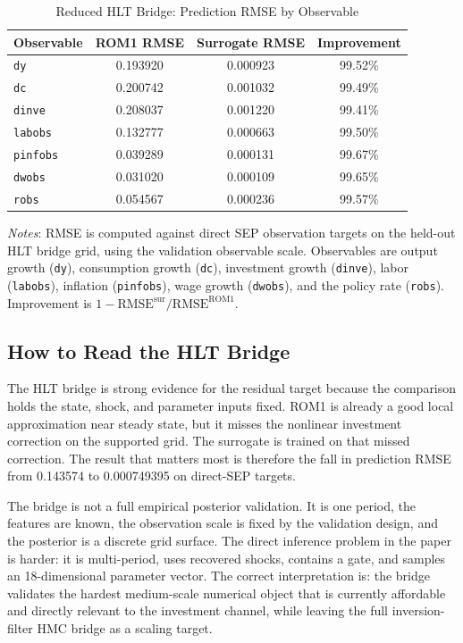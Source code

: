 \documentclass[12pt]{article}
\newcommand{\rom}{\mathrm{ROM1}}
\newcommand{\sur}{\mathrm{sur}}
\newcommand{\techappendixnotes}[1]{%
  \par\smallskip
  \noindent\begin{minipage}{0.92\textwidth}%
  \footnotesize #1%
  \end{minipage}\par%
}
\begin{document}
\begin{table}[htbp]
\centering
\caption{Reduced HLT Bridge: Prediction RMSE by Observable}
\label{tab:tech_hlt_bridge_rmse_obs}
\begin{tabular}{lccc}
\toprule
Observable & ROM1 RMSE & Surrogate RMSE & Improvement \\
\midrule
\texttt{dy} & 0.193920 & 0.000923 & 99.52\% \\
\texttt{dc} & 0.200742 & 0.001032 & 99.49\% \\
\texttt{dinve} & 0.208037 & 0.001220 & 99.41\% \\
\texttt{labobs} & 0.132777 & 0.000663 & 99.50\% \\
\texttt{pinfobs} & 0.039289 & 0.000131 & 99.67\% \\
\texttt{dwobs} & 0.031020 & 0.000109 & 99.65\% \\
\texttt{robs} & 0.054567 & 0.000236 & 99.57\% \\
\bottomrule
\end{tabular}
\techappendixnotes{\textit{Notes}: RMSE is computed against direct SEP
observation targets on the held-out HLT bridge grid, using the validation
observable scale. Observables are output growth (\texttt{dy}), consumption
growth (\texttt{dc}), investment growth (\texttt{dinve}), labor
(\texttt{labobs}), inflation (\texttt{pinfobs}), wage growth (\texttt{dwobs}),
and the policy rate (\texttt{robs}). Improvement is
\(1-\mathrm{RMSE}^{\sur}/\mathrm{RMSE}^{\rom}\).}
\end{table}

\subsection{How to Read the HLT Bridge}
\label{apptech:read_hlt_bridge}

The HLT bridge is strong evidence for the residual target because the
comparison holds the state, shock, and parameter inputs fixed. ROM1 is already
a good local approximation near steady state, but it misses the nonlinear
investment correction on the supported grid. The surrogate is trained on that
missed correction. The result that matters most is therefore the fall in
prediction RMSE from 0.143574 to 0.000749395 on direct-SEP targets.

The bridge is not a full empirical posterior validation. It is one period, the
features are known, the observation scale is fixed by the validation design,
and the posterior is a discrete grid surface. The direct inference problem in
the paper is harder: it is multi-period, uses recovered shocks, contains a gate,
and samples an 18-dimensional parameter vector. The correct interpretation is:
the bridge validates the hardest medium-scale numerical object that is
currently affordable and directly relevant to the investment channel, while
leaving the full inversion-filter HMC bridge as a scaling target.
\end{document}
